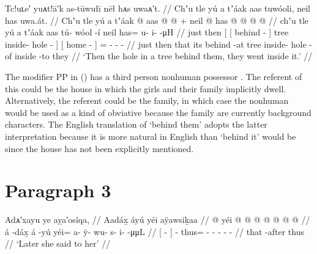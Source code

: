 \ex\label{ex:92-36-went-inside-tree-hole-behind}%
%
\begingl
	\glpreamble	Tc!uʟe′ yuᴀt!ā′k as-tūwułī nēł hᴀs uwaᴀ′t. //
	\glpreamble	Chʼu tle yú a tʼáak aas tuwóoli, neil has uwa.át. //
	\gla	Chʼu tle {} yú {} a tʼáak @ {} {}
			aas  @ {} @ {} {} +
		{} neil @ {} {}
		has @  @ {} @ {} @ {} //
	\glb	chʼu tle {} yú {} a tʼáak {} {} aas tú- wóol -í {}
		{} neil {} {}
		has= u- i-  -μH //
	\glc	just then {}[  {}[  behind - {}]
			tree inside- hole - {}]
		{}[ home - {}]
		= - -  - //
	\gld	just then {} that {} its behind -at {}
			tree inside- hole -of {}
		{} inside -to {}
		they  {} {} {} //
	\glft	‘Then the hole in a tree behind them, they went inside it.’
		//
\endgl
\xe

The modifier PP  in (\lastx) has a third person nonhuman possessor .
The referent of this could be the house in which the girls and their family implicitly dwell.
Alternatively, the referent could be the family, in which case the nonhuman would be used as a kind of obviative because the family are currently background characters.
The English translation of ‘behind them’ adopts the latter interpretation because it is more natural in English than ‘behind it’ would be since the house has not been explicitly mentioned.

\section{Paragraph 3}\label{sec:92-para-3}

\ex\label{ex:92-37-then-said}%
%
\begingl
	\glpreamble	Adᴀ′xayu ye aỵa′osîqa, //
	\glpreamble	Aadáx̱ áyú yéi aÿawsiḵaa //
	\gla	{}  @ {} {}  {}
		yéi @  @ {} @ {} @ {} @ {} @ {} @ {} //
	\glb	{} á -dáx̱ {} á -yú
		yéi= a- ÿ- wu- s- i-  -μμL //
	\glc	{}[  - {}]  -
		thus= - - - -  - //
	\gld	{} that -after {}  {}
		thus  {} {} {} {} {} {} //
	\glft	‘Later she said to her’
		//
\endgl
\xe


